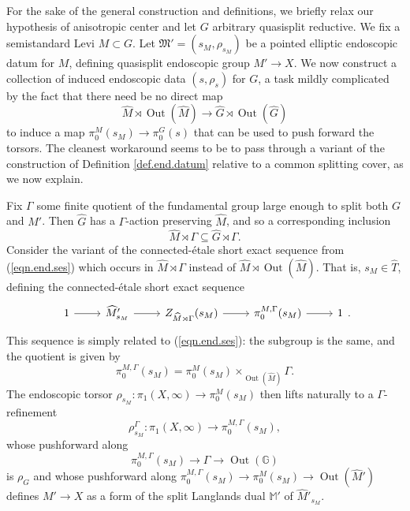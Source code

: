 \documentclass[openany]{amsbook}
\theoremstyle{definition}
\theoremstyle{remark}
\numberwithin{equation}{section}
\newcommand{\G}{\mathbb{G}}
\renewcommand{\-}{\operatorname{-}}
\newcommand{\Out}{\operatorname{Out}}
\newcommand{\M}{\mathbb{M}}
\newcommand{\fM}{\mathfrak{M}}
\begin{document}
For the sake of the general construction and definitions, we briefly relax our hypothesis of anisotropic center and let $G$ arbitrary quasisplit reductive. We fix a semistandard Levi $M \subset G$. Let $\fM' = (s_M, \rho_{s_M})$ be a pointed elliptic endoscopic datum for $M$, defining quasisplit endoscopic group $M' \to X$. We now construct a collection of induced endoscopic data $(s, \rho_s)$ for $G$, a task mildly complicated by the fact that there need be no direct map 
$$
    \widehat{M} \rtimes \Out(\widehat{M}) \to \widehat{G} \rtimes \Out(\widehat{G})
$$
to induce a map $\pi_0^M(s_M) \to \pi_0^G(s)$ that can be used to push forward the torsors. The cleanest workaround seems to be to pass through a variant of the construction of Definition \ref{def.end.datum} relative to a common splitting cover, as we now explain.

Fix $\Gamma$ some finite quotient of the fundamental group large enough to split both $G$ and $M'$. Then $\widehat{G}$ has a $\Gamma$-action preserving $\widehat{M}$, and so a corresponding inclusion
$$
    \widehat{M} \rtimes \Gamma \subseteq \widehat{G} \rtimes \Gamma.
$$
Consider the variant of the connected-\'etale short exact sequence from (\ref{eqn.end.ses}) which occurs in $\widehat{M} \rtimes \Gamma$ instead of $\widehat{M} \rtimes \Out(\widehat{M})$. That is, $s_M \in \widehat{T}$, defining the connected-\'etale short exact sequence
\[
\begin{tikzcd}[ampersand replacement=\&]
        1 \ar[r] \& \widehat{M}'_{s_M} \ar[r] \& Z_{\widehat{M} \rtimes \Gamma}(s_M) \ar[r] \& \pi_0^{M,\Gamma}(s_M) \ar[r] \& 1
\end{tikzcd}.
\]
This sequence is simply related to (\ref{eqn.end.ses}): the subgroup is the same, and the quotient is given by 
$$
    \pi_0^{M, \Gamma}(s_M) = \pi_0^M(s_M) \times_{\Out(\widehat{M})} \Gamma.
$$
The endoscopic torsor $\rho_{s_M} : \pi_1(X, \infty) \to \pi_0^M(s_M)$ then lifts naturally to a $\Gamma$-refinement
$$
    \rho_{s_M}^{\Gamma} : \pi_1(X, \infty) \to \pi_0^{M,\Gamma}(s_M),
$$
whose pushforward along $$\pi_0^{M,\Gamma}(s_M) \to \Gamma \to \Out(\G)$$ is $\rho_G$ and whose pushforward along $\pi_0^{M,\Gamma}(s_M) \to \pi_0^M(s_M) \to \Out(\widehat{M}')$ defines $M' \to X$ as a form of the split Langlands dual $\M'$ of $\widehat{M}'_{s_M}$. 
\end{document}
